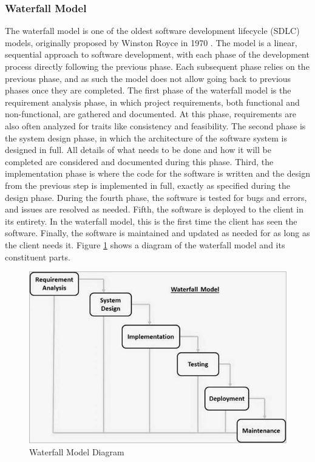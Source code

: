 \subsubsection{Waterfall Model}
The waterfall model is one of the oldest software development lifecycle (SDLC) models, originally proposed by Winston Royce in 1970 \cite{Gagan2020}. The model is a linear, sequential approach to software development, with each phase of the development process directly following the previous phase. Each subsequent phase relies on the previous phase, and as such the model does not allow going back to previous phases once they are completed. The first phase of the waterfall model is the requirement analysis phase, in which project requirements, both functional and non-functional, are gathered and documented. At this phase, requirements are also often analyzed for traits like consistency and feasibility. The second phase is the system design phase, in which the architecture of the software system is designed in full. All details of what needs to be done and how it will be completed are considered and documented during this phase. Third, the implementation phase is where the code for the software is written and the design from the previous step is implemented in full, exactly as specified during the design phase. During the fourth phase, the software is tested for bugs and errors, and issues are resolved as needed. Fifth, the software is deployed to the client in its entirety. In the waterfall model, this is the first time the client has seen the software. Finally, the software is maintained and updated as needed for as long as the client needs it. Figure \ref{fig:waterfall_model} shows a diagram of the waterfall model and its constituent parts.

\begin{figure}[htb]
    \centering
    \includegraphics[width=.75\textwidth]{02_dev_process/res/sdlc_waterfall_model.jpg}
    \caption[Waterfall Model Diagram]{Waterfall Model Diagram \cite{tutorialspointWaterfall}}
    \label{fig:waterfall_model}
\end{figure}

